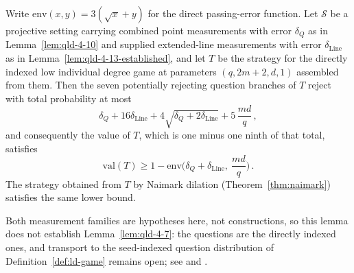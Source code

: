 \begin{lemma}
	\label{lem:direct-passing-value}
	\leanok
	Write $\mathrm{env}(x,y) = 3(\sqrt{x} + y)$ for the direct passing-error
	function. Let $\mathcal S$ be a projective setting carrying combined point
	measurements with error $\delta_Q$ as in Lemma~\ref{lem:qld-4-10} and
	supplied extended-line measurements with error $\delta_{\mathrm{Line}}$ as
	in Lemma~\ref{lem:qld-4-13-established}, and let $T$ be the strategy for
	the directly indexed low individual degree game at parameters
	$(q,2m+2,d,1)$ assembled from them. Then the seven potentially rejecting
	question branches of $T$ reject with total probability at most
	\[
		\delta_Q + 16\delta_{\mathrm{Line}}
		+ 4\sqrt{\delta_Q + 2\delta_{\mathrm{Line}}}
		+ 5\,\frac{md}{q}\,,
	\]
	and consequently the value of $T$, which is one minus one ninth of that
	total, satisfies
	\[
		\mathrm{val}(T) \ge 1 - \mathrm{env}\Big(
			\delta_Q + \delta_{\mathrm{Line}},\ \frac{md}{q}\Big)\,.
	\]
	The strategy obtained from $T$ by Naimark dilation
	(Theorem~\ref{thm:naimark}) satisfies the same lower bound.

	Both measurement families are hypotheses here, not constructions, so this
	lemma does not establish Lemma~\ref{lem:qld-4-7}: the questions are the
	directly indexed ones, and transport to the seed-indexed question
	distribution of Definition~\ref{def:ld-game} remains open; see
	\cite{gap:qpbt_ld-dimension-divisibility} and
	\cite{gap:qpbt_combined-lines-error-term}.
\end{lemma}
